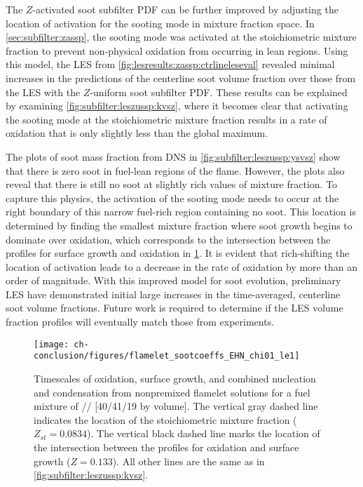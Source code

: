 The $Z$-activated soot subfilter PDF can be further improved by adjusting the location of activation for the sooting mode in mixture fraction space. In \cref{sec:subfilter:zassp}, the sooting mode was activated at the stoichiometric mixture fraction to prevent non-physical oxidation from occurring in lean regions. Using this model, the LES from \cref{fig:lesresults:zassp:ctrlineleseval} revealed minimal increases in the predictions of the centerline soot volume fraction over those from the LES with the $Z$-uniform soot subfilter PDF. These results can be explained by examining \cref{fig:subfilter:leszussp:kvsz}, where it becomes clear that activating the sooting mode at the stoichiometric mixture fraction results in a rate of oxidation that is only slightly less than the global maximum.

The plots of soot mass fraction from DNS in \cref{fig:subfilter:leszussp:ysvsz} show that there is zero soot in fuel-lean regions of the flame. However, the plots also reveal that there is still no soot at slightly rich values of mixture fraction. To capture this physics, the activation of the sooting mode needs to occur at the right boundary of this narrow fuel-rich region containing no soot. This location is determined by finding the smallest mixture fraction where soot growth begins to dominate over oxidation, which corresponds to the intersection between the profiles for surface growth and oxidation in \cref{fig:conclusion:future:zassp:shiftedz}. It is evident that rich-shifting the location of activation leads to a decrease in the rate of oxidation by more than an order of magnitude. With this improved model for soot evolution, preliminary LES have demonstrated initial large increases in the time-averaged, centerline soot volume fractions. Future work is required to determine if the LES volume fraction profiles will eventually match those from experiments.
\begin{figure}[htb]
  \centering
  \texttt{[image: ch-conclusion/figures/flamelet\_sootcoeffs\_EHN\_chi01\_le1]}
  \caption[Shifted Activation of ZASSP]{Timescales of oxidation, surface growth, and combined nucleation and condensation from nonpremixed flamelet solutions for a fuel mixture of // [40/41/19 by volume]. The vertical gray dashed line indicates the location of the stoichiometric mixture fraction ($Z_{st} = 0.0834$). The vertical black dashed line marks the location of the intersection between the profiles for oxidation and surface growth ($Z = 0.133$). All other lines are the same as in \cref{fig:subfilter:leszussp:kvsz}.}
  \label{fig:conclusion:future:zassp:shiftedz}
\end{figure}



